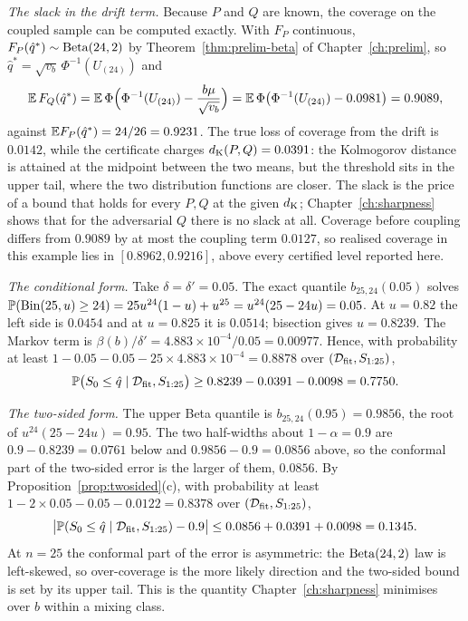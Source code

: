 \documentclass[../../../main.tex]{subfiles}
\begin{document}
\emph{The slack in the drift term.} Because $P$ and $Q$ are known, the coverage on the coupled sample can be computed exactly. With $F_P$ continuous, $F_P(\hat q^*)\sim\operatorname{Beta}(24,2)$ by Theorem~\ref{thm:prelim-beta} of Chapter~\ref{ch:prelim}, so $\hat q^*=\sqrt{v_b}\,\Phi^{-1}(U_{(24)})$ and
\[
\mathbb{E}\,F_Q(\hat q^*)=\mathbb{E}\,\Phi\Big(\Phi^{-1}(U_{(24)})-\frac{b\mu}{\sqrt{v_b}}\Big)=\mathbb{E}\,\Phi\big(\Phi^{-1}(U_{(24)})-0.0981\big)=0.9089 ,
\]
against $\mathbb{E} F_P(\hat q^*)=24/26=0.9231$. The true loss of coverage from the drift is $0.0142$, while the certificate charges $d_{\mathrm{K}}(P,Q)=0.0391$: the Kolmogorov distance is attained at the midpoint between the two means, but the threshold sits in the upper tail, where the two distribution functions are closer. The slack is the price of a bound that holds for every $P,Q$ at the given $d_{\mathrm{K}}$; Chapter~\ref{ch:sharpness} shows that for the adversarial $Q$ there is no slack at all. Coverage before coupling differs from $0.9089$ by at most the coupling term $0.0127$, so realised coverage in this example lies in $[0.8962,0.9216]$, above every certified level reported here.


\emph{The conditional form.} Take $\delta=\delta'=0.05$. The exact quantile $b_{25,24}(0.05)$ solves $\mathbb{P}(\mathrm{Bin}(25,u)\ge24)=25u^{24}(1-u)+u^{25}=u^{24}(25-24u)=0.05$. At $u=0.82$ the left side is $0.0454$ and at $u=0.825$ it is $0.0514$; bisection gives $u=0.8239$. The Markov term is $\beta(b)/\delta'=4.883\times10^{-4}/0.05=0.00977$. Hence, with probability at least $1-0.05-0.05-25\times4.883\times10^{-4}=0.8878$ over $(\mathcal D_{\mathrm{fit}},S_{1:25})$,
\[
\mathbb{P}\big(S_0\le\hat q\mid\mathcal D_{\mathrm{fit}},S_{1:25}\big)\ge0.8239-0.0391-0.0098=0.7750 .
\]

\emph{The two-sided form.} The upper Beta quantile is $b_{25,24}(0.95)=0.9856$, the root of $u^{24}(25-24u)=0.95$. The two half-widths about $1-\alpha=0.9$ are $0.9-0.8239=0.0761$ below and $0.9856-0.9=0.0856$ above, so the conformal part of the two-sided error is the larger of them, $0.0856$. By Proposition~\ref{prop:twosided}(c), with probability at least $1-2\times0.05-0.05-0.0122=0.8378$ over $(\mathcal D_{\mathrm{fit}},S_{1:25})$,
\[
\big|\mathbb{P}(S_0\le\hat q\mid\mathcal D_{\mathrm{fit}},S_{1:25})-0.9\big|\le0.0856+0.0391+0.0098=0.1345 .
\]
At $n=25$ the conformal part of the error is asymmetric: the $\operatorname{Beta}(24,2)$ law is left-skewed, so over-coverage is the more likely direction and the two-sided bound is set by its upper tail. This is the quantity Chapter~\ref{ch:sharpness} minimises over $b$ within a mixing class.
\end{document}
